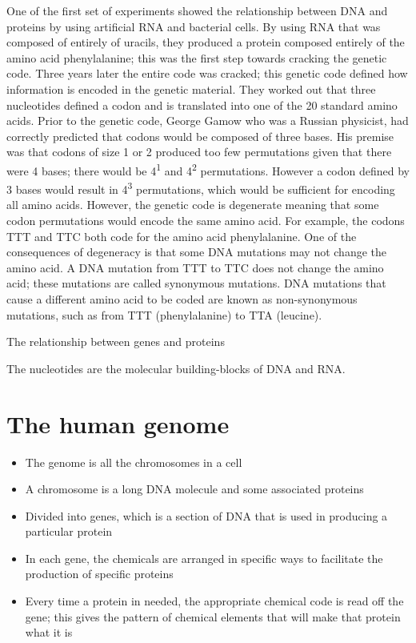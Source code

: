 One of the first set of experiments showed the relationship between DNA and proteins by using artificial RNA and bacterial cells\cite{pmid14471390}. By using RNA that was composed of entirely of uracils, they produced a protein composed entirely of the amino acid phenylalanine; this was the first step towards cracking the genetic code. Three years later the entire code was cracked\cite{pmid5330357}; this genetic code defined how information is encoded in the genetic material. They worked out that three nucleotides defined a codon and is translated into one of the 20 standard amino acids. Prior to the genetic code, George Gamow who was a Russian physicist, had correctly predicted that codons would be composed of three bases. His premise was that codons of size 1 or 2 produced too few permutations given that there were 4 bases; there would be 4\textsuperscript{1} and 4\textsuperscript{2} permutations. However a codon defined by 3 bases would result in 4\textsuperscript{3} permutations, which would be sufficient for encoding all amino acids. However, the genetic code is degenerate meaning that some codon permutations would encode the same amino acid. For example, the codons TTT and TTC both code for the amino acid phenylalanine. One of the consequences of degeneracy is that some DNA mutations may not change the amino acid. A DNA mutation from TTT to TTC does not change the amino acid; these mutations are called synonymous mutations. DNA mutations that cause a different amino acid to be coded are known as non-synonymous mutations, such as from TTT (phenylalanine) to TTA (leucine).

The relationship between genes and proteins

The nucleotides are the molecular building-blocks of DNA and RNA.

\section{The human genome}

\begin{itemize}

   \item The genome is all the chromosomes in a cell
   \item A chromosome is a long DNA molecule and some associated proteins
   \item Divided into genes, which is a section of DNA that is used in producing a particular protein
   \item In each gene, the chemicals are arranged in specific ways to facilitate the production of specific proteins
   \item Every time a protein in needed, the appropriate chemical code is read off the gene; this gives the pattern of chemical elements that will make that protein what it is
   
\end{itemize}

